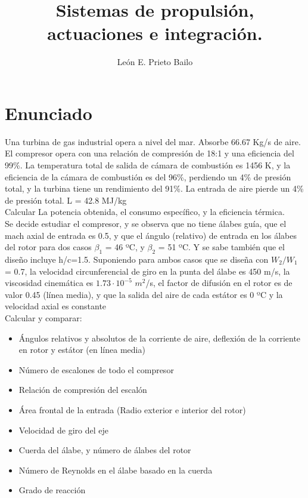 \documentclass{report}
\title{Sistemas de propulsión, actuaciones e integración.}
\author{León E. Prieto Bailo}
\begin{document}
\maketitle


\section{Enunciado}

Una turbina de gas industrial opera a nivel del mar. Absorbe 66.67 Kg/s de aire. El compresor opera con una relación de compresión de 18:1 y una eficiencia del 99\%. La temperatura total de salida de cámara de combustión es 1456 K, y la eficiencia de la cámara de combustión es del 96\%, perdiendo un 4\% de presión total, y la turbina tiene un rendimiento del 91\%. La entrada de aire pierde un 4\% de presión total. L = 42.8 MJ/kg\\

Calcular La potencia obtenida, el consumo específico, y la eficiencia térmica.\\

Se decide estudiar el compresor, y se observa que no tiene álabes guía, que el mach axial de entrada es 0.5, y que el ángulo (relativo) de entrada en los álabes del rotor para dos casos $\beta_1$ = 46 ºC, y $\beta_2$ = 51 ºC. Y se sabe también que el diseño incluye h/c=1.5. Suponiendo para ambos casos que se diseña con $W_2/W_1$ = 0.7, la velocidad circunferencial de giro en la punta del álabe es 450 m/s, la viscosidad cinemática es $1.73\cdot10^{-5}$ $m^2$/s, el factor de difusión en el rotor es de valor 0.45 (línea media), y que la salida del aire de cada estátor es 0 ºC y la velocidad axial es constante\\

Calcular y comparar:\

\begin{itemize}
    \item Ángulos relativos y absolutos de la corriente de aire, deflexión de la corriente en rotor y estátor (en línea media)
    \item Número de escalones de todo el compresor
    \item Relación de compresión del escalón
    \item Área frontal de la entrada (Radio exterior e interior del rotor)
    \item Velocidad de giro del eje
    \item Cuerda del álabe, y número de álabes del rotor
    \item Número de Reynolds en el álabe basado en la cuerda
    \item Grado de reacción
\end{itemize}
\newpage
\end{document}
